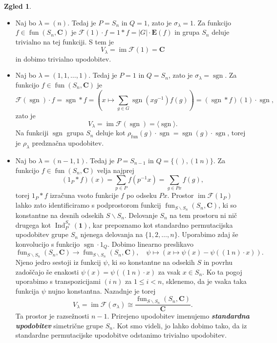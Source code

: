\documentclass[11pt]{book}
\def\CC{\mathbf{C}}
\def\11{\mathbf{1}}
\def\Fcal{\mathcal{F}}
\def\EE{\mathbf{E}}
\def\youngsym{\sigma_{\lambda}}
\DeclareMathOperator\image{im}
\DeclareMathOperator\sgn{sgn}
\DeclareMathOperator\Ind{Ind}
\DeclareMathOperator\fun{fun}
\def\definicija{\color{rdeca}\bf\em}
\theoremstyle{definition}
\theoremstyle{zgled}
\newtheorem*{zgled}{Zgled}
\theoremstyle{odprtproblem}
\theoremstyle{domacanaloga}
\theoremstyle{izrek}
\begin{document}
\begin{zgled} \leavevmode
\begin{itemize}
    \item Naj bo $\lambda = (n)$. Tedaj je $P = S_n$ in $Q = 1$, zato je $\youngsym = 1$. Za funkcijo $f \in \fun(S_n, \CC)$ je $\Fcal(1) \cdot f = 1 * f = |G| \cdot \EE(f)$ in grupa $S_n$ deluje trivialno na tej funkciji. S tem je
    \[
        V_{\lambda} = \image \Fcal(1) = \CC
    \]
    in dobimo trivialno upodobitev.

    \item Naj bo $\lambda = (1,1,\dots,1)$. Tedaj je $P = 1$ in $Q = S_n$, zato je $\youngsym = \sgn$. Za funkcijo $f \in \fun(S_n, \CC)$ je
    \[
        \Fcal(\sgn) \cdot f = \sgn * f = \left( x \mapsto \sum_{g \in G} \sgn(xg^{-1}) f(g) \right) = (\sgn * f)(1) \cdot \sgn,
    \]
    zato je
    \[
        V_{\lambda} = \image \Fcal(\sgn) = \langle \sgn \rangle.
    \]
    Na funkciji $\sgn$ grupa $S_n$ deluje kot $\rho_{\fun}(g) \cdot \sgn = \sgn(g) \cdot \sgn$, torej je $\rho_{\lambda}$ predznačna upodobitev.
    
    \item Naj bo $\lambda = (n-1,1)$. Tedaj je $P = S_{n-1}$ in $Q = \{ (), (1 \ n)\}$. Za funkcijo $f \in \fun(S_n, \CC)$ velja najprej
    \[
        \left( 1_P * f \right) (x) = \sum_{p \in P} f(p^{-1} x) = \sum_{g \in Px} f(g),
    \]
    torej $1_P * f$ izračuna vsoto funkcije $f$ po odseku $Px$. Prostor $\image \Fcal(1_P)$ lahko zato identificiramo s podprostorom funkcij $\fun_{S \backslash S_n}(S_n, \CC)$, ki so konstantne na desnih odsekih $S \backslash S_n$. Delovanje $S_n$ na tem prostoru ni nič drugega kot $\Ind^{S_n}_P(\11)$, kar prepoznamo kot standardno permutacijska upodobitev grupe $S_n$ njenega delovanja na $\{ 1, 2, \dots, n \}$. Uporabimo zdaj še konvolucijo s funkcijo $\sgn \cdot 1_Q$. Dobimo linearno preslikavo
    \[
        \textstyle \fun_{S \backslash S_n}(S_n, \CC) \to \fun_{S \backslash S_n}(S_n, \CC), \quad
        \psi \mapsto \left( x \mapsto \psi(x) - \psi((1 \ n) \cdot x) \right).
    \]
    Njeno jedro sestoji iz funkcij $\psi$, ki so konstantne na odsekih $S$ in povrhu zadoščajo še enakosti $\psi(x) = \psi((1 \ n) \cdot x)$ za vsak $x \in S_n$. Ko ta pogoj uporabimo s transpozicijami $(i \ n)$ za $1 \leq i < n$, sklenemo, da je vsaka taka funkcija $\psi$ nujno konstantna. Nazadnje je torej
    \[
        V_{\lambda} = \image \Fcal(\youngsym) \cong \frac{\textstyle \fun_{S \backslash S_n}(S_n, \CC)}{\CC}.
    \]
    Ta prostor je razsežnosti $n-1$. Prirejeno upodobitev imenujemo {\definicija standardna upodobitev} simetrične grupe $S_n$. Kot smo videli, jo lahko dobimo tako, da iz standardne permutacijske upodobitve odstanimo trivialno upodobitev.
\end{itemize}
\end{zgled}
\end{document}
